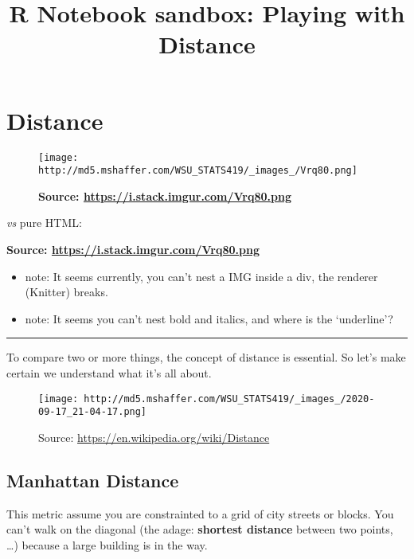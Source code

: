 \documentclass[
]{article}
\title{R Notebook sandbox: Playing with Distance}
\author{}
\date{\vspace{-2.5em}}
\providecommand{\tightlist}{%
  \setlength{\itemsep}{0pt}\setlength{\parskip}{0pt}}
\begin{document}
\maketitle

{
\setcounter{tocdepth}{4}
\tableofcontents
}
\hypertarget{distance}{%
\section{Distance}\label{distance}}

\begin{figure}
\centering
\texttt{[image: http://md5.mshaffer.com/WSU\_STATS419/\_images\_/Vrq80.png]}
\caption{\textbf{Source: \url{https://i.stack.imgur.com/Vrq80.png}}}
\end{figure}

\emph{vs} pure HTML:

\textbf{Source: \url{https://i.stack.imgur.com/Vrq80.png}}

\begin{itemize}
\tightlist
\item
  note: It seems currently, you can't nest a IMG inside a div, the
  renderer (Knitter) breaks.
\item
  note: It seems you can't nest bold and italics, and where is the
  `underline'?
\end{itemize}

\begin{center}\rule{0.5\linewidth}{0.5pt}\end{center}

To compare two or more things, the concept of distance is essential. So
let's make certain we understand what it's all about.

\begin{figure}
\centering
\texttt{[image: http://md5.mshaffer.com/WSU\_STATS419/\_images\_/2020-09-17\_21-04-17.png]}
\caption{Source: \url{https://en.wikipedia.org/wiki/Distance}}
\end{figure}

\hypertarget{manhattan-distance}{%
\subsection{Manhattan Distance}\label{manhattan-distance}}

This metric assume you are constrainted to a grid of city streets or
blocks. You can't walk on the diagonal (the adage: \textbf{shortest
distance} between two points, \ldots) because a large building is in the
way.
\end{document}
